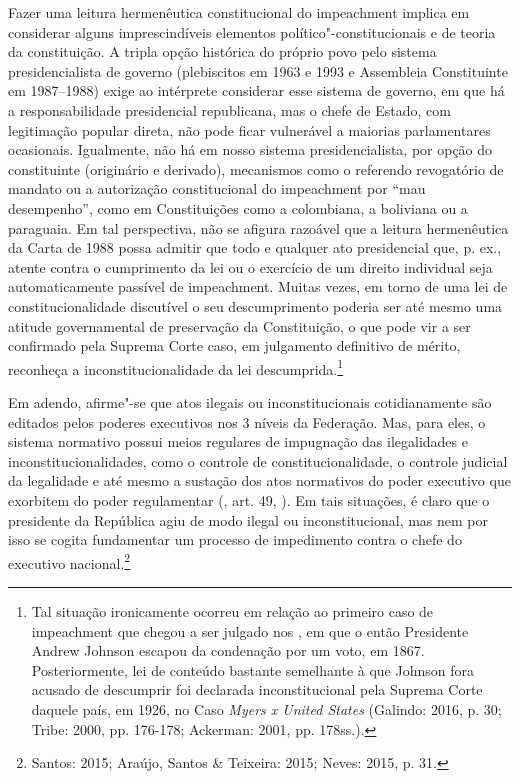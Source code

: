 Fazer uma leitura hermenêutica constitucional do impeachment
implica em considerar alguns imprescindíveis elementos
político"-constitucionais e de teoria da constituição. A tripla opção
histórica do próprio povo pelo sistema presidencialista de governo
(plebiscitos em 1963 e 1993 e Assembleia Constituinte em 1987--1988)
exige ao intérprete considerar esse sistema de governo, em que há a
responsabilidade presidencial republicana, mas o chefe de Estado, com
legitimação popular direta, não pode ficar vulnerável a maiorias
parlamentares ocasionais. Igualmente, não há em nosso sistema
presidencialista, por opção do constituinte (originário e derivado),
mecanismos como o referendo revogatório de mandato ou a autorização
constitucional do impeachment por ``mau desempenho'', como em
Constituições como a colombiana, a boliviana ou a paraguaia. Em tal
perspectiva, não se afigura razoável que a leitura hermenêutica da Carta
de 1988 possa admitir que todo e qualquer ato presidencial que, p. ex.,
atente contra o cumprimento da lei ou o exercício de um direito
individual seja automaticamente passível de impeachment. Muitas
vezes, em torno de uma lei de constitucionalidade discutível o seu
descumprimento poderia ser até mesmo uma atitude governamental de
preservação da Constituição, o que pode vir a ser confirmado pela
Suprema Corte caso, em julgamento definitivo de mérito, reconheça a
inconstitucionalidade da lei descumprida.\footnote{Tal situação
  ironicamente ocorreu em relação ao primeiro caso de impeachment
  que chegou a ser julgado nos , em que o então Presidente Andrew
  Johnson escapou da condenação por um voto, em 1867. Posteriormente,
  lei de conteúdo bastante semelhante à que Johnson fora acusado de
  descumprir foi declarada inconstitucional pela Suprema Corte daquele
  país, em 1926, no Caso \emph{Myers x United States} (Galindo: 2016, p.
  30; Tribe: 2000, pp. 176-178; Ackerman: 2001, pp. 178ss.).}

Em adendo, afirme"-se que atos ilegais ou inconstitucionais
cotidianamente são editados pelos poderes executivos nos 3 níveis da
Federação. Mas, para eles, o sistema normativo possui meios regulares de
impugnação das ilegalidades e inconstitucionalidades, como o controle de
constitucionalidade, o controle judicial da legalidade e até mesmo a
sustação dos atos normativos do poder executivo que exorbitem do poder
regulamentar (, art. 49, ). Em tais situações, é claro que o
presidente da República agiu de modo ilegal ou inconstitucional, mas nem
por isso se cogita fundamentar um processo de impedimento contra o chefe
do executivo nacional.\footnote{Santos: 2015; Araújo, Santos \& Teixeira: 2015;
Neves: 2015, p. 31.}


